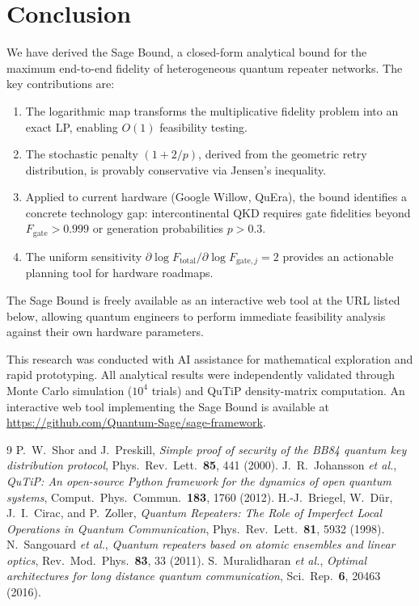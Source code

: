 \documentclass[aps,pra,reprint,amsmath,amssymb,superscriptaddress]{revtex4-2}
\begin{document}

\section{Conclusion}

We have derived the Sage Bound, a closed-form analytical bound for the maximum end-to-end fidelity of heterogeneous quantum repeater networks. The key contributions are:
\begin{enumerate}
\item The logarithmic map transforms the multiplicative fidelity problem into an exact LP, enabling $O(1)$ feasibility testing.
\item The stochastic penalty $(1+2/p)$, derived from the geometric retry distribution, is provably conservative via Jensen's inequality.
\item Applied to current hardware (Google Willow, QuEra), the bound identifies a concrete technology gap: intercontinental QKD requires gate fidelities beyond $F_{\text{gate}} > 0.999$ or generation probabilities $p > 0.3$.
\item The uniform sensitivity $\partial \log F_{\text{total}} / \partial \log F_{\text{gate},j} = 2$ provides an actionable planning tool for hardware roadmaps.
\end{enumerate}
The Sage Bound is freely available as an interactive web tool at the URL listed below, allowing quantum engineers to perform immediate feasibility analysis against their own hardware parameters.

\begin{acknowledgments}
This research was conducted with AI assistance for mathematical exploration and rapid prototyping. All analytical results were independently validated through Monte Carlo simulation ($10^4$ trials) and QuTiP density-matrix computation. An interactive web tool implementing the Sage Bound is available at \url{https://github.com/Quantum-Sage/sage-framework}.
\end{acknowledgments}

\begin{thebibliography}{9}
 P.~W.~Shor and J.~Preskill, \emph{Simple proof of security of the BB84 quantum key distribution protocol}, Phys.\ Rev.\ Lett.\ \textbf{85}, 441 (2000).
 J.~R.~Johansson \emph{et al.}, \emph{QuTiP: An open-source Python framework for the dynamics of open quantum systems}, Comput.\ Phys.\ Commun.\ \textbf{183}, 1760 (2012).
 H.-J.~Briegel, W.~D\"ur, J.~I.~Cirac, and P.~Zoller, \emph{Quantum Repeaters: The Role of Imperfect Local Operations in Quantum Communication}, Phys.\ Rev.\ Lett.\ \textbf{81}, 5932 (1998).
 N.~Sangouard \emph{et al.}, \emph{Quantum repeaters based on atomic ensembles and linear optics}, Rev.\ Mod.\ Phys.\ \textbf{83}, 33 (2011).
 S.~Muralidharan \emph{et al.}, \emph{Optimal architectures for long distance quantum communication}, Sci.\ Rep.\ \textbf{6}, 20463 (2016).
\end{thebibliography}
\end{document}

